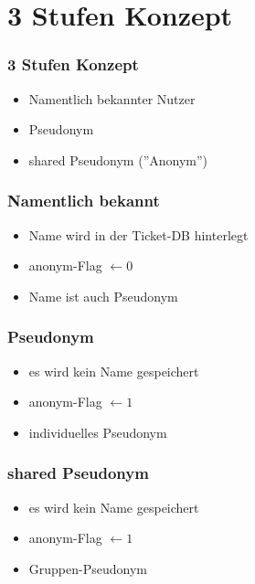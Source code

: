 \section{3 Stufen Konzept}
\begin{frame}
	\frametitle{3 Stufen Konzept}
	\begin{itemize}
		\item<2-> Namentlich bekannter Nutzer
		\item<3-> Pseudonym
		\item<4-> shared Pseudonym (''Anonym'')
	\end{itemize}
\end{frame}


\begin{frame}
	\frametitle{Namentlich bekannt}
	\begin{itemize}
		\item<2-> Name wird in der Ticket-DB hinterlegt
		\item<3-> anonym-Flag $\leftarrow 0$ 
		\item<4-> Name ist auch Pseudonym
	\end{itemize}
\end{frame}


\begin{frame}
	\frametitle{Pseudonym}
	\begin{itemize}
		\item<2-> es wird kein Name gespeichert
		\item<3-> anonym-Flag $\leftarrow 1$  
		\item<4-> individuelles Pseudonym
	\end{itemize}
\end{frame}


\begin{frame}
	\frametitle{shared Pseudonym}
	\begin{itemize}
		\item<2-> es wird kein Name gespeichert
		\item<3-> anonym-Flag $\leftarrow 1$  
		\item<4-> Gruppen-Pseudonym  
	\end{itemize}
\end{frame}

